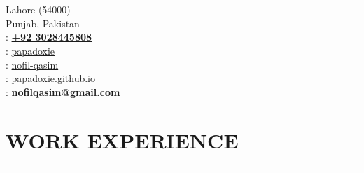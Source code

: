 \documentclass[]{resume}
\begin{document}
%
%

\hfill
\begin{minipage}[t]{0.66\textwidth}

    \vspace{-628pt}

    \hspace*{0pt}\hfill    \\
    \hspace*{0pt}\hfill    \\
    \hspace*{0pt}\hfill Lahore (54000) \\
    \hspace*{0pt}\hfill Punjab, Pakistan \\
    \hspace*{0pt}\hfill {}: \textbf{\href{tel:+923028445808}{+92 3028445808}} \\
    \hspace*{0pt}\hfill {}: \href{https://github.com/papadoxie}{papadoxie}\\
    \hspace*{0pt}\hfill {}: \href{https://linkedin.com/in/nofil-qasim}{nofil-qasim}\\
    \hspace*{0pt}\hfill {}: \href{https://papadoxie.github.io}{papadoxie.github.io}\\
    \hspace*{0pt}\hfill {}: \textbf{\href{mailto:nofilqasim@gmail.com}{nofilqasim@gmail.com}}



    \vspace{4.8pt}

    \section{WORK EXPERIENCE}
    \noindent\rule{12.5cm}{0.4pt}

     
    \noindent


\end{minipage}
\end{document}
